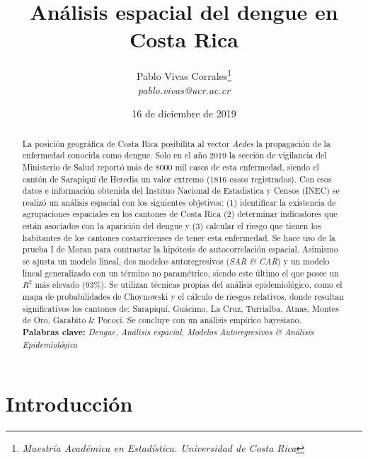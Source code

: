 \documentclass[12pt,a4paper]{article}
\author{Pablo Vivas Corrales\footnote{\textit{Maestría Académica en Estadística. Universidad de Costa Rica}}\\\textit{pablo.vivas@ucr.ac.cr}}
\title{Análisis espacial del dengue en Costa Rica}
\date{16 de diciembre de 2019}
\begin{document}
\maketitle
\begin{abstract}
\noindent
La posición geográfica de Costa Rica posibilita al vector \textit{Aedes} la propagación de la enfermedad conocida como dengue. Solo en el año 2019 la sección de vigilancia del Ministerio de Salud reportó más de 8000 mil casos de esta enfermedad, siendo el cantón de Sarapiquí de Heredia un valor extremo (1816 casos registrados). Con esos datos e información obtenida del Instituo Nacional de Estadistica y Censos (INEC) se realizó un análisis espacial con los siguientes objetivos: (1) identificar la existencia de agrupaciones espaciales en los cantones de Costa Rica (2) determinar indicadores que están asociados con la aparición del dengue y (3) calcular el riesgo que tienen los habitantes de los cantones costarricenses de tener esta enfermedad. Se hace uso de la prueba I de Moran para contrastar la hipótesis de autocorrelación espacial. Asimismo se ajusta un modelo lineal, dos modelos autoregresivos (\textit{SAR \& CAR}) y un modelo lineal generalizado con un término no paramétrico, siendo este último el que posee un $R^{2}$ más elevado (93\%). Se utilizan técnicas propias del análisis epidemiológico, como el mapa de probabilidades de Choynowski y el cálculo de riesgos relativos, donde resultan significativos los cantones de: Sarapiquí, Guácimo, La Cruz, Turrialba, Atnas, Montes de Oro, Garabito \& Pococí. Se concluye con un análisis empírico bayesiano.\\
\textbf{Palabras clave:} \textit{Dengue, Análisis espacial, Modelos Autoregresivos \& Análisis Epidemiológico} 
\end{abstract}
\section{Introducción}
\end{document}
